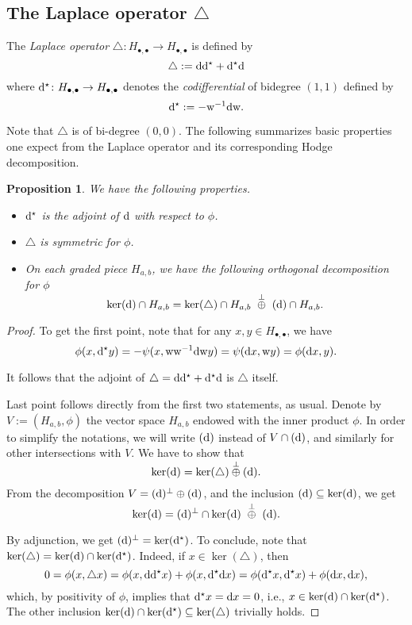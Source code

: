 \documentclass[11pt]{amsart}
\newtheorem{prop}[thm]{Proposition}
\theoremstyle{definition}
\numberwithin{equation}{section}
\newcommand{\ie}{i.e.}
\renewcommand{\~}{\widetilde}
\newcommand{\bul}{\bullet} %
\let\Im\relax
\DeclareMathOperator{\Im}{Im} %
\newcommand{\dual}{\star} %
\renewcommand{\d}{{\rm d}} %
\newcommand{\ooplus}{\raisebox{0pt}[0pt]{${}\overset\perp\oplus{}$}} %
\newcommand{\wooplus}{\ \ooplus\ } %
\newcommand{\dd}{\d^\dual} %
\newcommand{\Lap}{\triangle} %
\newcommand{\w}{{\rm w}} %
\begin{document}
\subsection{The Laplace operator $\Lap$} The \emph{Laplace operator} $\Lap\colon H_{\bul,\bul}\to H_{\bul,\bul}$ is defined by
\[ \Lap := \d \dd + \dd \d \]
where $\dd\colon H_{\bul,\bul}\to H_{\bul,\bul}$ denotes the \emph{codifferential} of bidegree $(1,1)$ defined by
\[ \dd:= -\w^{-1} \d \w. \]

Note that $\Lap$ is of bi-degree $(0,0)$. The following summarizes basic properties one expect from the Laplace operator and its corresponding Hodge decomposition.
\begin{prop} \label{prop:Lap}
We have the following properties.
\begin{itemize}
\item $\dd$ is the adjoint of $\d$ with respect to $\phi$.
\item $\Lap$ is symmetric for $\phi$.
\item On each graded piece $H_{a,b}$, we have the following orthogonal decomposition for $\phi$
\[ \ker(\d)\cap H_{a,b} = \ker(\Lap)\cap H_{a,b} \wooplus \Im(\d)\cap H_{a,b}. \]
\end{itemize}
\end{prop}

\begin{proof}To get the first point, note that for any $x,y\in H_{\bul, \bul}$, we have
\[ \phi(x,\dd y)=-\psi(x,\w \w^{-1}\d\w y)=\psi(\d x,\w y)=\phi(\d x, y). \]

It follows that the adjoint of $\Lap=\d\dd+\dd\d$ is $\Lap$ itself.

\medskip

Last point follows directly from the first two statements, as usual. Denote by $V:=(H_{a,b},\phi)$ the vector space $H_{a,b}$ endowed with the inner product $\phi$. In order to simplify the notations, we will write $\Im(\d)$ instead of $V\cap\Im(\d)$, and similarly for other intersections with $V$. We have to show that
\[ \ker(\d)=\ker(\Lap)\ooplus\Im(\d).\]
From the decomposition $V=\Im(\d)^\perp \oplus \Im(\d)$, and the inclusion $\Im(\d)\subseteq\ker(\d)$, we get
\[ \ker(\d)=\Im(\d)^\perp\cap\ker(\d) \wooplus \Im(\d). \]

By adjunction, we get $\Im(\d)^\perp=\ker(\dd)$. To conclude, note that $\ker(\Lap)=\ker(\d)\cap\ker(\dd)$. Indeed, if $x\in\ker(\Lap)$, then
\[ 0 = \phi(x,\Lap x) = \phi(x, \d\dd x)+\phi(x, \dd\d x) = \phi(\dd x, \dd x)+\phi(\d x, \d x), \]
which, by positivity of $\phi$, implies that $\dd x=\d x=0$, \ie, $x\in\ker(\d)\cap\ker(\dd)$. The other inclusion $\ker(\d)\cap\ker(\dd) \subseteq \ker(\Lap)$ trivially holds.  \qedhere
\end{proof}
\end{document}
